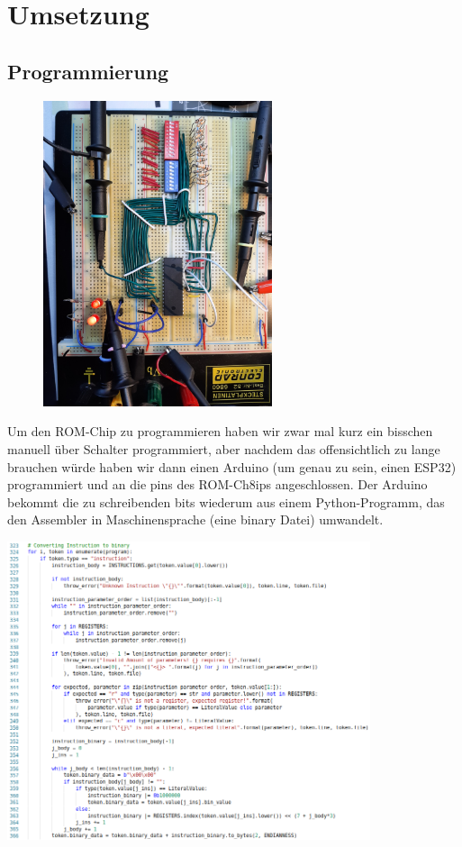 \documentclass{scrartcl}
\begin{document}
    \section{Umsetzung}
    \subsection{Programmierung}

        \begin{figure}
        \vspace{-30pt}
        \begin{center}
        \includegraphics[width=0.6\textwidth]{ROM_Programmer_Manual_01}
        \end{center}
        \vspace{-20pt}
        \end{figure}

    Um den ROM-Chip zu programmieren haben wir zwar mal kurz ein bisschen manuell über Schalter programmiert, aber nachdem das offensichtlich zu lange brauchen würde haben wir dann einen Arduino (um genau zu sein, einen ESP32) programmiert und an die pins des ROM-Ch8ips angeschlossen.
    Der Arduino bekommt die zu schreibenden bits wiederum aus einem Python-Programm, das den Assembler in Maschinensprache (eine binary Datei) umwandelt.

    \includegraphics[width=0.8\textwidth]{assembler_code}
\end{document}
